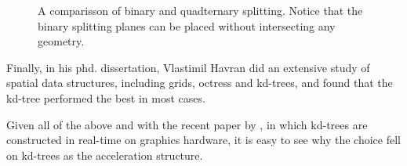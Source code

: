 \begin{figure}
  \centering
  \caption{A comparisson of binary and quadternary splitting. Notice
    that the binary splitting planes can be placed without
    intersecting any geometry.}
  \label{fig:binQuadSplit}
\end{figure}


Finally, in his phd. dissertation, Vlastimil Havran did an extensive
study of spatial data structures, including grids, octress and
kd-trees, and found that the kd-tree performed the best in most cases.

Given all of the above and with the recent paper by \zhou, in which
kd-trees are constructed in real-time on graphics hardware, it is easy
to see why the choice fell on kd-trees as the acceleration structure.


